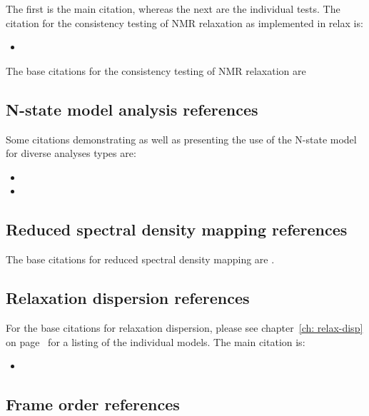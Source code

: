 The first is the main citation, whereas the next are the individual tests.
The citation for the consistency testing of NMR relaxation as implemented in relax is:
\begin{itemize}
  \item {}
\end{itemize}

The base citations for the consistency testing of NMR relaxation are \citet{Fushman99,Farrow95,Fushman98}



\subsection*{N-state model analysis references}

Some citations demonstrating as well as presenting the use of the N-state model for diverse analyses types are:
\begin{itemize}
  \item {}
  \item {}
\end{itemize}



\subsection*{Reduced spectral density mapping references}

The base citations for reduced spectral density mapping are \citet{Farrow95,Lefevre96}.



\subsection*{Relaxation dispersion references}

For the base citations for relaxation dispersion, please see chapter~\ref{ch: relax-disp} on page~\pageref{ch: relax-disp} for a listing of the individual models.
The main citation is:
\begin{itemize}
  \item {}
\end{itemize}



\subsection*{Frame order references}


